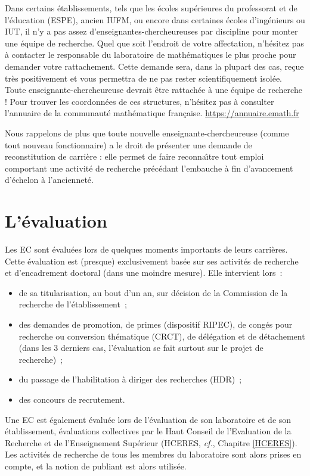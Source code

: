 Dans certains \'etablissements, tels que 
les \'ecoles sup\'erieures du professorat et de l'\'education (ESPE), ancien IUFM,
ou encore dans
certaines \'ecoles d'ing\'enieurs ou IUT, il n'y a pas assez
d'enseignant\mp e\mp s-chercheur\mp euse\mp s par discipline pour monter une \'equipe de
recherche.
Quel que soit l'endroit de votre affectation, n'h\'esitez pas
\`a contacter le responsable du laboratoire de math\'e\-matiques le plus
proche pour demander votre rattachement. Cette demande sera, dans la
plupart des cas, re\c cue tr\`es positivement et vous permettra de ne
pas rester scientifiquement isol\'e\mp e. Tout\mp e enseignant\mp e-chercheur\mp euse
devrait \^etre rattach\'e\mp e \`a une \'equipe de
recherche ! Pour trouver les coordonn\'ees de ces structures, n'h\'esitez pas \`a
consulter l'annuaire de la communaut\'e math\'e\-matique
fran\c caise. \url{https://annuaire.emath.fr}

Nous rappelons de plus que tout\mp e nouvel\mp le enseignant\mp e-chercheur\mp euse (comme tout nouveau fonctionnaire)
a le droit de pr\'esenter une demande de reconstitution de carri\`ere : elle permet de faire reconna\^\i tre tout emploi comportant une activit\'e de recherche pr\'ec\'edant l'embauche \`a fin d'avancement d'\'echelon \`a l'anciennet\'e.

\section{L'\'evaluation}

Les EC sont \'evalu\'e\mp e\mp s lors de quelques moments importants de leurs carri\`eres.
Cette \'evaluation est (presque) exclusivement bas\'ee sur ses activit\'es de recherche
et d'encadrement doctoral (dans une moindre mesure).
Elle intervient lors~:
\begin{itemize}
\item de sa titularisation, au bout d'un an, sur d\'ecision de la Commission de la recherche de l'\'etablissement~;
\item des demandes de promotion, de primes (dispositif RIPEC),
de cong\'es pour recherche ou conversion
th\'ematique (CRCT), de d\'el\'egation et de d\'etachement (dans les
3 derniers cas, l'\'evaluation se fait surtout sur le projet de
recherche)~;
\item du passage de l'habilitation \`a diriger des recherches (HDR)~;
\item des concours de recrutement.
\end{itemize}
Un\mp e EC est \'egalement \'evalu\'e\mp e lors de l'\'evaluation de son laboratoire
et de son \'etablissement,
\'evaluations collectives par le Haut Conseil de l'Evaluation de la
Recherche et de l'Enseignement Sup\'erieur (HCERES, {\em cf.}, Chapitre \ref{HCERES}).
Les activit\'es de recherche de tous les membres du
laboratoire sont alors prises en compte, et la notion de \og publiant\fg{} est
alors utilis\'ee.
%

